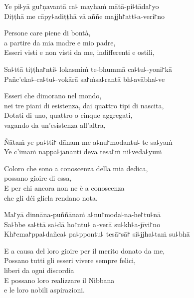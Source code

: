 Ye pi꜕yā gu꜓ṇavantā ca꜕ mayhaṁ mātā-pi꜕tāda꜓yo\\
Diṭṭhā me cāpy꜕adiṭṭhā vā aññe majjh꜓att꜕a-veri꜓no

\begin{english}
 Persone care piene di bontà,\\
  a partire da mia madre e mio padre,\\
Esseri visti e non visti da me, indifferenti e ostili,
\end{english}

Sa꜕ttā tiṭṭha꜓nti꜕ lokasmiṁ te-bhummā ca꜕tu꜕-yoni꜓kā\\
Pañc'eka꜕-ca꜕tu꜕-vokārā sa꜓ṁsa꜕rantā bh꜕avābha꜕ve

\begin{english}
Esseri che dimorano nel mondo,\\
 nei tre piani di esistenza, dai quattro tipi di nascita,\\
Dotati di uno, quattro o cinque aggregati,\\
vagando da un'esistenza all'altra,
\end{english}

Ñātaṁ ye pa꜕tti꜓-dānam-me a꜕nu꜓modantu꜕ te sa꜕yaṁ\\
Ye c'imaṁ nappa꜕jānanti devā tesa꜓ṁ ni꜕veda꜕yuṁ

\clearpage

\begin{english}
 Coloro che sono a conoscenza della mia dedica,\\
  possano gioire di essa,\\
E per chi ancora non ne è a conoscenza\\
che gli déi gliela rendano nota.
\end{english}

Ma꜓yā dinnāna-puññānaṁ a꜕nu꜓moda꜕na-he꜓tu꜕nā\\
Sa꜕bbe sa꜕ttā sa꜕dā ho꜓ntu꜕ a꜕verā su꜕kh꜕a-jīvi꜓no\\
Kh꜓ema꜓ppa꜕dañca꜕ pa꜕ppontu꜕ tesā꜓sā꜓ si꜕jjha꜕taṁ su꜕bhā

\begin{english}
 E a causa del loro gioire per il merito donato da me,\\
Possano tutti gli esseri vivere sempre felici,\\
 liberi da ogni discordia\\
E possano loro realizzare il Nibbana\\
e le loro nobili aspirazioni.
\end{english}

